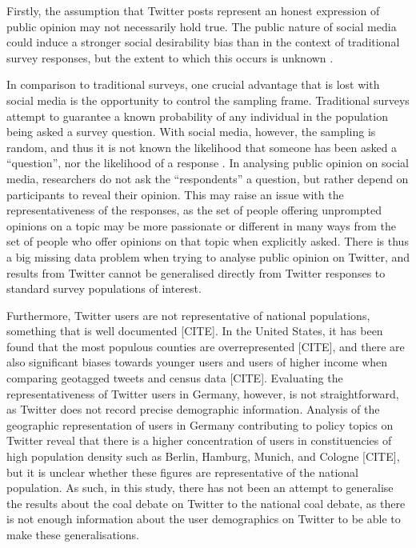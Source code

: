 \documentclass[12pt,onecolumn,twoside]{layout}
\begin{document}
Firstly, the assumption that Twitter posts represent an honest expression of public opinion may not necessarily hold true. The public nature of social media could induce a stronger social desirability bias than in the context of traditional survey responses, but the extent to which this occurs is unknown \cite{Klasnja2018}. 

In comparison to traditional surveys, one crucial advantage that is lost with social media is the opportunity to control the sampling frame. Traditional surveys attempt to guarantee a known probability of any individual in the population being asked a survey question. With social media, however, the sampling is random, and thus it is not known the likelihood that someone has been asked a ``question'', nor the likelihood of a response \cite{Klasnja2018}. In analysing public opinion on social media, researchers do not ask the ``respondents'' a question, but rather depend on participants to reveal their opinion. This may raise an issue with the representativeness of the responses, as the set of people offering unprompted opinions on a topic may be more passionate or different in many ways from the set of people who offer opinions on that topic when explicitly asked. There is thus a big missing data problem when trying to analyse public opinion on Twitter, and results from Twitter cannot be generalised directly from Twitter responses to standard survey populations of interest. 

Furthermore, Twitter users are not representative of national populations, something that is well documented [CITE]. In the United States, it has been found that the most populous counties are overrepresented [CITE], and there are also significant biases towards younger users and users of higher income when comparing geotagged tweets and census data [CITE]. Evaluating the representativeness of Twitter users in Germany, however, is not straightforward, as Twitter does not record precise demographic information. Analysis of the geographic representation of users in Germany contributing to policy topics on Twitter reveal that there is a higher concentration of users in constituencies of high population density such as Berlin, Hamburg, Munich, and Cologne [CITE], but it is unclear whether these figures are representative of the national population. As such, in this study, there has not been an attempt to generalise the results about the coal debate on Twitter to the national coal debate, as there is not enough information about the user demographics on Twitter to be able to make these generalisations. 
\end{document}
